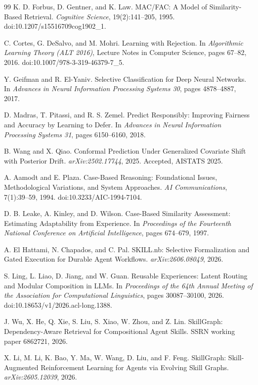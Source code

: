 \begin{thebibliography}{99}
K. D. Forbus, D. Gentner, and K. Law. MAC/FAC: A Model of Similarity-Based Retrieval. \emph{Cognitive Science}, 19(2):141--205, 1995. doi:10.1207/s15516709cog1902\_1.

C. Cortes, G. DeSalvo, and M. Mohri. Learning with Rejection. In \emph{Algorithmic Learning Theory (ALT 2016)}, Lecture Notes in Computer Science, pages 67--82, 2016. doi:10.1007/978-3-319-46379-7\_5.

Y. Geifman and R. El-Yaniv. Selective Classification for Deep Neural Networks. In \emph{Advances in Neural Information Processing Systems 30}, pages 4878--4887, 2017.

D. Madras, T. Pitassi, and R. S. Zemel. Predict Responsibly: Improving Fairness and Accuracy by Learning to Defer. In \emph{Advances in Neural Information Processing Systems 31}, pages 6150--6160, 2018.

B. Wang and X. Qiao. Conformal Prediction Under Generalized Covariate Shift with Posterior Drift. \emph{arXiv:2502.17744}, 2025. Accepted, AISTATS 2025.

A. Aamodt and E. Plaza. Case-Based Reasoning: Foundational Issues, Methodological Variations, and System Approaches. \emph{AI Communications}, 7(1):39--59, 1994. doi:10.3233/AIC-1994-7104.

D. B. Leake, A. Kinley, and D. Wilson. Case-Based Similarity Assessment: Estimating Adaptability from Experience. In \emph{Proceedings of the Fourteenth National Conference on Artificial Intelligence}, pages 674--679, 1997.

A. El Hattami, N. Chapados, and C. Pal. SKILL.nb: Selective Formalization and Gated Execution for Durable Agent Workflows. \emph{arXiv:2606.08049}, 2026.

S. Ling, L. Liao, D. Jiang, and W. Guan. Reusable Experiences: Latent Routing and Modular Composition in LLMs. In \emph{Proceedings of the 64th Annual Meeting of the Association for Computational Linguistics}, pages 30087--30100, 2026. doi:10.18653/v1/2026.acl-long.1388.

J. Wu, X. He, Q. Xie, S. Liu, S. Xiao, W. Zhou, and Z. Lin. SkillGraph: Dependency-Aware Retrieval for Compositional Agent Skills. SSRN working paper 6862721, 2026.

X. Li, M. Li, K. Bao, Y. Ma, W. Wang, D. Liu, and F. Feng. SkillGraph: Skill-Augmented Reinforcement Learning for Agents via Evolving Skill Graphs. \emph{arXiv:2605.12039}, 2026.


\end{thebibliography}
